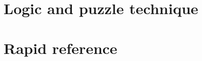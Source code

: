 \documentclass[10pt,openany]{book}
\begin{document}
\part{Logic and puzzle technique}













\part{Rapid reference}



\backmatter
\printindex
\end{document}
